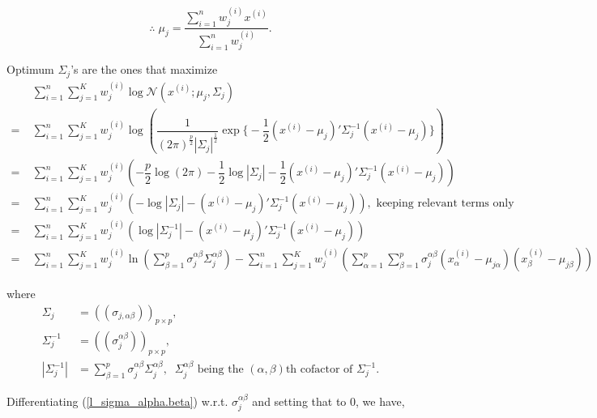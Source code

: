 \documentclass[11pt, a4paper]{article}
\begin{document}
$$\boxed{\therefore \; \mu_j = \dfrac{\sum \limits_{i = 1}^{n} w_j^{(i)} x^{(i)}}{\sum \limits_{i = 1}^{n} w_j^{(i)}}.}$$


Optimum $\Sigma_j$'s are the ones that maximize 
\begin{align}
&\sum \limits_{i = 1}^{n} \sum \limits_{j = 1}^{K} w_j^{(i)} \log \mathcal{N}(x^{(i)}; \mu_j, \Sigma_j) \nonumber \\[0.5em]
= \; &\sum \limits_{i = 1}^{n} \sum \limits_{j = 1}^{K} w_j^{(i)} \log \left( \dfrac{1}{(2\pi)^{\frac{p}{2}} |\Sigma_j|^{\frac{1}{2}} }
\exp\Bigg\{-\dfrac{1}{2} \left(x^{(i)}-\mu_j\right)'\Sigma_j^{-1}\left(x^{(i)}-\mu_j\right)\Bigg\} \right) \nonumber \\[0.5em]
= \; &\sum \limits_{i = 1}^{n} \sum \limits_{j = 1}^{K} w_j^{(i)} \left(-\dfrac{p}{2}\log(2\pi) - \dfrac{1}{2}\log|\Sigma_j| - \dfrac{1}{2} \left(x^{(i)}-\mu_j\right)' \Sigma_j^{-1} \left(x^{(i)}-\mu_j\right)\right) \nonumber \\[0.5em]
= \; &\sum \limits_{i = 1}^{n} \sum \limits_{j = 1}^{K} w_j^{(i)} \left(- \log|\Sigma_j| - \left(x^{(i)}-\mu_j\right)' \Sigma_j^{-1} \left(x^{(i)}-\mu_j\right)\right), \text{ keeping relevant terms only} \nonumber \\[0.5em]
= \; &\sum \limits_{i = 1}^{n} \sum \limits_{j = 1}^{K} w_j^{(i)} \left(\log|\Sigma_j^{-1}| - \left(x^{(i)}-\mu_j\right)' \Sigma_j^{-1} \left(x^{(i)}-\mu_j\right)\right) \nonumber\\[0.5em]
= \; &\sum \limits_{i = 1}^{n} \sum \limits_{j = 1}^{K} w_j^{(i)} \ln\left( \sum \limits_{\beta = 1}^{p} \sigma_j^{\alpha \beta}\Sigma_j^{\alpha \beta} \right)- \sum \limits_{i = 1}^{n} \sum \limits_{j = 1}^{K} w_j^{(i)} \left( \sum \limits_{\alpha = 1}^{p} \sum \limits_{\beta = 1}^{p} \sigma_j^{\alpha \beta} \left(x_{\alpha}^{(i)}-\mu_{j\alpha}\right)\left(x_{\beta}^{(i)}-\mu_{j\beta}\right) \right) \label{l_sigma_alpha.beta}
\end{align}

where 
\begin{align*}
\Sigma_j &= ((\sigma_{j, \alpha \beta}))_{p \times p}, \\[0.3em]
\Sigma_j^{-1} &= ((\sigma_j^{\alpha \beta}))_{p \times p}, \\[0.3em]
|\Sigma_j^{-1}| &= \sum \limits_{\beta = 1}^{p} \sigma_j^{\alpha \beta}\Sigma_j^{\alpha \beta}, \;\; \Sigma_j^{\alpha \beta} \text{ being the } (\alpha, \beta)\text{th cofactor of } \Sigma_j^{-1}.
\end{align*}

Differentiating (\ref{l_sigma_alpha.beta}) w.r.t. $\sigma_j^{\alpha \beta}$ and setting that to $0$, we have,
\end{document}
